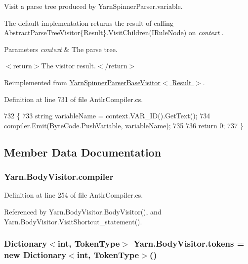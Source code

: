 Visit a parse tree produced by Yarn\-Spinner\-Parser.\-variable. 

The default implementation returns the result of calling Abstract\-Parse\-Tree\-Visitor\{\-Result\}.\-Visit\-Children(\-I\-Rule\-Node) on {\itshape context} . 


\begin{DoxyParams}{Parameters}
{\em context} & The parse tree.\\
\hline
\end{DoxyParams}
$<$return$>$The visitor result.$<$/return$>$ 

Reimplemented from \hyperlink{a00199_a51d3d21fc833b5b4676ac84a46cdef87}{Yarn\-Spinner\-Parser\-Base\-Visitor$<$ Result $>$}.



Definition at line 731 of file Antlr\-Compiler.\-cs.


\begin{DoxyCode}
732         \{
733             \textcolor{keywordtype}{string} variableName = context.VAR\_ID().GetText();
734             compiler.Emit(ByteCode.PushVariable, variableName);
735 
736             \textcolor{keywordflow}{return} 0;
737         \}
\end{DoxyCode}


\subsection{Member Data Documentation}
\hypertarget{a00046_a39d71c6de5e1c9f7d2f78ac2ccd5743d}{
\subsubsection[{compiler}]{ Yarn.\-Body\-Visitor.\-compiler\hspace{0.3cm}{\ttfamily [package]}}}\label{a00046_a39d71c6de5e1c9f7d2f78ac2ccd5743d}


Definition at line 254 of file Antlr\-Compiler.\-cs.



Referenced by Yarn.\-Body\-Visitor.\-Body\-Visitor(), and Yarn.\-Body\-Visitor.\-Visit\-Shortcut\-\_\-statement().

\hypertarget{a00046_ab8aa4dbe47a807e3d973df2b85e3fffc}{
\subsubsection[{tokens}]{\setlength{\rightskip}{0pt plus 5cm}Dictionary$<$int, {\bf Token\-Type}$>$ Yarn.\-Body\-Visitor.\-tokens = new Dictionary$<$int, {\bf Token\-Type}$>$()\hspace{0.3cm}{\ttfamily [private]}}}\label{a00046_ab8aa4dbe47a807e3d973df2b85e3fffc}


